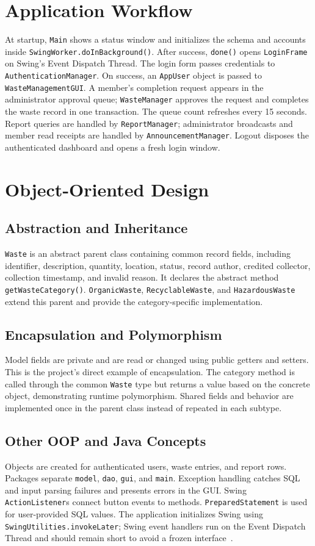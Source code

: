 \documentclass[12pt,a4paper]{report}
\begin{document}
\section{Application Workflow}
At startup, \texttt{Main} shows a status window and initializes the schema and accounts inside \texttt{SwingWorker.doInBackground()}. After success, \texttt{done()} opens \texttt{LoginFrame} on Swing's Event Dispatch Thread. The login form passes credentials to \texttt{AuthenticationManager}. On success, an \texttt{AppUser} object is passed to \texttt{WasteManagementGUI}. A member's completion request appears in the administrator approval queue; \texttt{WasteManager} approves the request and completes the waste record in one transaction. The queue count refreshes every 15 seconds. Report queries are handled by \texttt{ReportManager}; administrator broadcasts and member read receipts are handled by \texttt{AnnouncementManager}. Logout disposes the authenticated dashboard and opens a fresh login window.

\section{Object-Oriented Design}
\subsection{Abstraction and Inheritance}
\texttt{Waste} is an abstract parent class containing common record fields, including identifier, description, quantity, location, status, record author, credited collector, collection timestamp, and invalid reason. It declares the abstract method \texttt{getWasteCategory()}. \texttt{OrganicWaste}, \texttt{RecyclableWaste}, and \texttt{HazardousWaste} extend this parent and provide the category-specific implementation.

\subsection{Encapsulation and Polymorphism}
Model fields are private and are read or changed using public getters and setters. This is the project's direct example of encapsulation. The category method is called through the common \texttt{Waste} type but returns a value based on the concrete object, demonstrating runtime polymorphism. Shared fields and behavior are implemented once in the parent class instead of repeated in each subtype.

\subsection{Other OOP and Java Concepts}
Objects are created for authenticated users, waste entries, and report rows. Packages separate \texttt{model}, \texttt{dao}, \texttt{gui}, and \texttt{main}. Exception handling catches SQL and input parsing failures and presents errors in the GUI. Swing \texttt{ActionListener}s connect button events to methods. \texttt{PreparedStatement} is used for user-provided SQL values. The application initializes Swing using \texttt{SwingUtilities.invokeLater}; Swing event handlers run on the Event Dispatch Thread and should remain short to avoid a frozen interface~\cite{oracleSwingEDT}.
\end{document}
